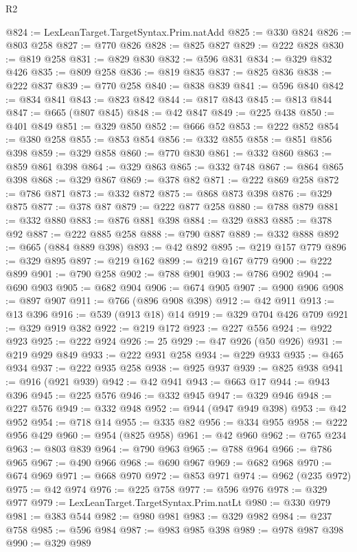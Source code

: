 \begin{lexlean}{R2}
\begin{coremodule}
@824 := LexLeanTarget.TargetSyntax.Prim.natAdd
@825 := @330 @824
@826 := @803 @258
@827 := @770 @826
@828 := @825 @827
@829 := @222 @828
@830 := @819 @258
@831 := @829 @830
@832 := @596 @831
@834 := @329 @832 @426
@835 := @809 @258
@836 := @819 @835
@837 := @825 @836
@838 := @222 @837
@839 := @770 @258
@840 := @838 @839
@841 := @596 @840
@842 := @834 @841
@843 := @823 @842
@844 := @817 @843
@845 := @813 @844
@847 := @665 (@807 @845)
@848 := @42 @847
@849 := @225 @438
@850 := @401 @849
@851 := @329 @850
@852 := @666 @52
@853 := @222 @852
@854 := @380 @258
@855 := @853 @854
@856 := @332 @855
@858 := @851 @856 @398
@859 := @329 @858
@860 := @770 @830
@861 := @332 @860
@863 := @859 @861 @398
@864 := @329 @863
@865 := @332 @748
@867 := @864 @865 @398
@868 := @329 @867
@869 := @378 @82
@871 := @222 @869 @258
@872 := @786 @871
@873 := @332 @872
@875 := @868 @873 @398
@876 := @329 @875
@877 := @378 @87
@879 := @222 @877 @258
@880 := @788 @879
@881 := @332 @880
@883 := @876 @881 @398
@884 := @329 @883
@885 := @378 @92
@887 := @222 @885 @258
@888 := @790 @887
@889 := @332 @888
@892 := @665 (@884 @889 @398)
@893 := @42 @892
@895 := @219 @157 @779
@896 := @329 @895
@897 := @219 @162
@899 := @219 @167 @779
@900 := @222 @899
@901 := @790 @258
@902 := @788 @901
@903 := @786 @902
@904 := @690 @903
@905 := @682 @904
@906 := @674 @905
@907 := @900 @906
@908 := @897 @907
@911 := @766 (@896 @908 @398)
@912 := @42 @911
@913 := @13 @396
@916 := @539 (@913 @18) @14
@919 := @329 @704 @426 @709
@921 := @329 @919 @382
@922 := @219 @172
@923 := @227 @556
@924 := @922 @923
@925 := @222 @924
@926 := 25
@929 := @47 @926 (@50 @926)
@931 := @219 @929 @849
@933 := @222 @931 @258
@934 := @229 @933
@935 := @465 @934
@937 := @222 @935 @258
@938 := @925 @937
@939 := @825 @938
@941 := @916 (@921 @939)
@942 := @42 @941
@943 := @663 @17
@944 := @943 @396
@945 := @225 @576
@946 := @332 @945
@947 := @329 @946
@948 := @227 @576
@949 := @332 @948
@952 := @944 (@947 @949 @398)
@953 := @42 @952
@954 := @718 @14
@955 := @335 @82
@956 := @334 @955
@958 := @222 @956 @429
@960 := @954 (@825 @958)
@961 := @42 @960
@962 := @765 @234
@963 := @803 @839
@964 := @790 @963
@965 := @788 @964
@966 := @786 @965
@967 := @490 @966
@968 := @690 @967
@969 := @682 @968
@970 := @674 @969
@971 := @668 @970
@972 := @853 @971
@974 := @962 (@235 @972)
@975 := @42 @974
@976 := @225 @758
@977 := @596 @976
@978 := @329 @977
@979 := LexLeanTarget.TargetSyntax.Prim.natLt
@980 := @330 @979
@981 := @383 @544
@982 := @980 @981
@983 := @329 @982
@984 := @237 @758
@985 := @596 @984
@987 := @983 @985 @398
@989 := @978 @987 @398
@990 := @329 @989

\end{coremodule}
\end{lexlean}
